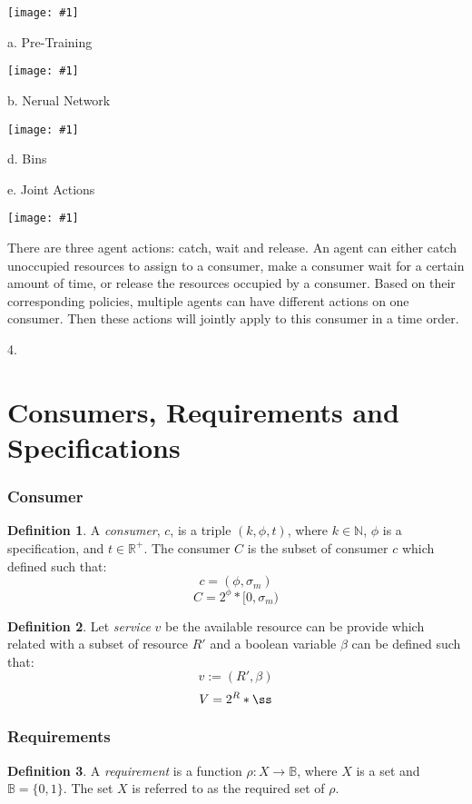 \documentclass{article}
\theoremstyle{definition}
\newtheorem{definition}{Definition}[section]
\theoremstyle{remark}
\newcommand{\reqfunc}[2]{#1:#2\rightarrow\mathbb{B}}
\newcommand{\addpic}[1]{\texttt{[image: \#1]}}
\begin{document}
	
	\addpic{Training2.jpg}
	
	
	a. Pre-Training
	
	\addpic{Pre-Train.jpg}
	
	b. Nerual Network

	\addpic{Neural-Network.jpeg}
	
	
	d. Bins
	
	e. Joint Actions
	
	\addpic{Joint-action.jpg}
	
	There are three agent actions: catch, wait and release. An agent can either catch unoccupied resources to assign to a consumer, make a consumer wait for a certain amount of time, or release the resources occupied by a consumer. Based on their corresponding policies, multiple agents can have different actions on one consumer. Then these actions will jointly apply to this consumer in a time order.
		
	4.
	
	\newpage
	
	\part{Consumers, Requirements and Specifications}
	
	\section{Consumer}
	
		\begin{definition}
			A \emph{consumer}, $c$, is a triple $(k, \phi, t)$, where $k \in \mathbb{N}$, $\phi$ is a specification, and $t \in \mathbb{R}^{+}$. The consumer $C$ is the subset of consumer $c$ which defined such that:
			\[
			c = (\phi , \sigma_m)
			\]
			\[
			C = 2^{\phi}*[0,\sigma_m)
			\]
		\end{definition}
		
		\begin{definition}
			Let \emph{service} $v$ be the available resource can be provide which related with a subset of resource $R'$ and a boolean variable $\beta$ can be defined such that:
			\[
			v := (R', \beta)
			\]
			\[
			V = 2^{R}*{\ss}
			\]
		\end{definition}
	
	\section{Requirements}
	
		\begin{definition}
			A \emph{requirement} is a function $\reqfunc{\rho}{X}$, where $X$ is a set and $\mathbb{B} = \{0,1\}$. The set $X$ is referred to as the required set of $\rho$.
		\end{definition}
		
\end{document}
